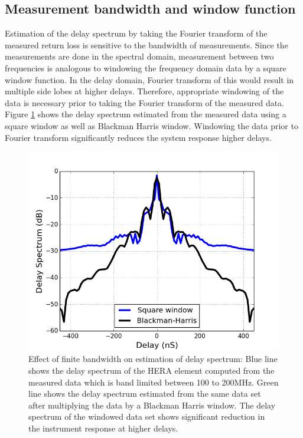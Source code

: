\documentclass[twocolumn]{emulateapj}
\begin{document}
    \subsection{Measurement bandwidth and window function}
    
    Estimation of the delay spectrum by taking the Fourier transform of the
    measured return loss is sensitive to the bandwidth of measurements. Since the
    measurements are done in the spectral domain, measurement between two
    frequencies is analogous to windowing the frequency domain data by a square
    window function. In the delay domain, Fourier transform of this would result in
    multiple side lobes at higher delays. Therefore, appropriate windowing of the
    data is  necessary prior to taking the Fourier transform of the measured data.
    Figure \ref{fig:window} shows the delay spectrum estimated from the measured
    data using a square window as well as Blackman Harris window. Windowing the
    data prior to Fourier transform significantly reduces the system response
    higher delays.  
    
    \begin{figure}
    \centering
    \includegraphics[width=\linewidth]{GB_reflectometry_part3/plot/ds_window.png}
    \caption{Effect of finite bandwidth on estimation of delay spectrum: Blue line shows the delay spectrum of the HERA element computed from the measured data which is band limited between 100 to 200MHz. Green line shows the delay spectrum estimated from the same data set after multiplying the data by a Blackman Harris window. The delay spectrum of the windowed data set shows significant reduction in the instrument response at higher delays.}
    \label{fig:window}
    \end{figure} 
    
\end{document}

